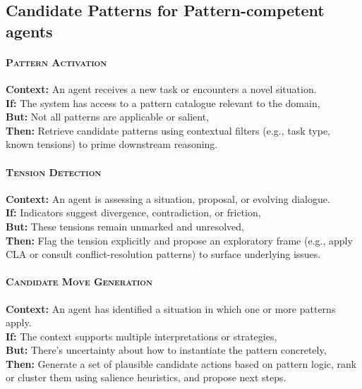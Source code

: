 \documentclass[acmlarge,timestamp]{acmart}
\begin{document}
\subsection*{Candidate Patterns for Pattern-competent agents}

\paragraph*{{\scshape Pattern Activation}}

\noindent \textbf{Context:} An agent receives a new task or encounters a novel situation.\\
 \textbf{If:} The system has access to a pattern catalogue relevant to the domain,\\
 \textbf{But:} Not all patterns are applicable or salient,\\
 \textbf{Then:} Retrieve candidate patterns using contextual filters (e.g., task type, known tensions) to prime downstream reasoning.

 \paragraph*{{\scshape Tension Detection}}

\noindent \textbf{Context:} An agent is assessing a situation, proposal, or evolving dialogue.\\
 \textbf{If:} Indicators suggest divergence, contradiction, or friction,\\
 \textbf{But:} These tensions remain unmarked and unresolved,\\
 \textbf{Then:} Flag the tension explicitly and propose an exploratory frame (e.g., apply CLA or consult conflict-resolution patterns) to surface underlying issues.

 \paragraph*{{\scshape Candidate Move Generation}}

\noindent \textbf{Context:} An agent has identified a situation in which one or more patterns apply.\\
 \textbf{If:} The context supports multiple interpretations or strategies,\\
 \textbf{But:} There’s uncertainty about how to instantiate the pattern concretely,\\
 \textbf{Then:} Generate a set of plausible candidate actions based on pattern logic, rank or cluster them using salience heuristics, and propose next steps.
\end{document}

